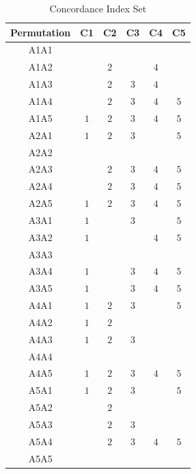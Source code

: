 \begin{table}[!ht]
    \parbox{0.49\textwidth}{
        \centering
        \caption{Concordance Index Set}
        \label{tab:cis}

        \begin{tabular}{|c|c|c|c|c|c|}
            \toprule
            Permutation & C1  & C2  & C3  & C4  & C5  \\

            \midrule
            A1A1        &     &     &     &     &     \\
            A1A2        &     & $2$ &     & $4$ &     \\
            A1A3        &     & $2$ & $3$ & $4$ &     \\
            A1A4        &     & $2$ & $3$ & $4$ & $5$ \\
            A1A5        & $1$ & $2$ & $3$ & $4$ & $5$ \\
            A2A1        & $1$ & $2$ & $3$ &     & $5$ \\
            A2A2        &     &     &     &     &     \\
            A2A3        &     & $2$ & $3$ & $4$ & $5$ \\
            A2A4        &     & $2$ & $3$ & $4$ & $5$ \\
            A2A5        & $1$ & $2$ & $3$ & $4$ & $5$ \\
            A3A1        & $1$ &     & $3$ &     & $5$ \\
            A3A2        & $1$ &     &     & $4$ & $5$ \\
            A3A3        &     &     &     &     &     \\
            A3A4        & $1$ &     & $3$ & $4$ & $5$ \\
            A3A5        & $1$ &     & $3$ & $4$ & $5$ \\
            A4A1        & $1$ & $2$ & $3$ &     & $5$ \\
            A4A2        & $1$ & $2$ &     &     &     \\
            A4A3        & $1$ & $2$ & $3$ &     &     \\
            A4A4        &     &     &     &     &     \\
            A4A5        & $1$ & $2$ & $3$ & $4$ & $5$ \\
            A5A1        & $1$ & $2$ & $3$ &     & $5$ \\
            A5A2        &     & $2$ &     &     &     \\
            A5A3        &     & $2$ & $3$ &     &     \\
            A5A4        &     & $2$ & $3$ & $4$ & $5$ \\
            A5A5        &     &     &     &     &     \\


\end{tabular}}
\end{table}
